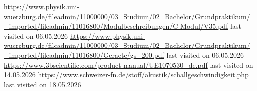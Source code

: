\documentclass[a4paper,10pt,twocolumn]{scrartcl} %
\begin{document}


	




	
\begin{thebibliography}{}    %
	\url{https://www.physik.uni-wuerzburg.de/fileadmin/11000000/03_Studium/02_Bachelor/Grundpraktikum/_imported/fileadmin/11016800/Modulbeschreibungen/C-Modul/V35.pdf} last visited on 06.05.2026
	\url{https://www.physik.uni-wuerzburg.de/fileadmin/11000000/03_Studium/02_Bachelor/Grundpraktikum/_imported/fileadmin/11016800/Geraete/gs_200.pdf} last visited on 06.05.2026
	\url{https://www.3bscientific.com/product-manual/UE1070530_de.pdf} last visited on 14.05.2026
	\url{https://www.schweizer-fn.de/stoff/akustik/schallgeschwindigkeit.php} last visited on 18.05.2026
\end{thebibliography}


\end{document}
